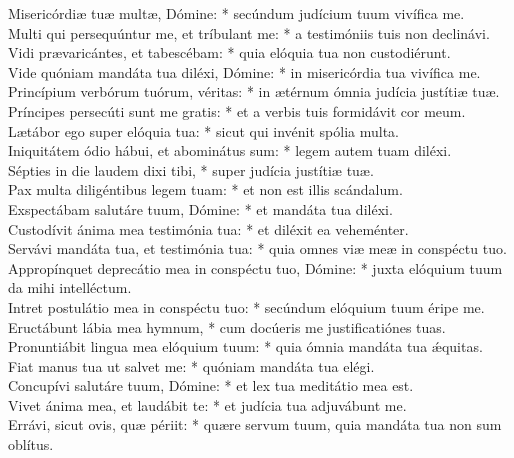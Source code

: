 {	Misericórdiæ tuæ multæ, Dómine: * secúndum judícium tuum vivífica me. \\
	Multi qui persequúntur me, et tríbulant me: * a testimóniis tuis non declinávi. \\
	Vidi prævaricántes, et tabescébam: * quia elóquia tua non custodiérunt. \\
	Vide quóniam mandáta tua diléxi, Dómine: * in misericórdia tua vivífica me. \\
	Princípium verbórum tuórum, véritas: * in ætérnum ómnia judícia justítiæ tuæ. \\
	Príncipes persecúti sunt me gratis: * et a verbis tuis formidávit cor meum. \\
	Lætábor ego super elóquia tua: * sicut qui invénit spólia multa. \\
	Iniquitátem ódio hábui, et abominátus sum: * legem autem tuam diléxi. \\
	Sépties in die laudem dixi tibi, * super judícia justítiæ tuæ. \\
	Pax multa diligéntibus legem tuam: * et non est illis scándalum. \\
	Exspectábam salutáre tuum, Dómine: * et mandáta tua diléxi. \\
	Custodívit ánima mea testimónia tua: * et diléxit ea veheménter. \\
	Servávi mandáta tua, et testimónia tua: * quia omnes viæ meæ in conspéctu tuo. \\
	Appropínquet deprecátio mea in conspéctu tuo, Dómine: * juxta elóquium tuum da mihi intelléctum. \\
	Intret postulátio mea in conspéctu tuo: * secúndum elóquium tuum éripe me. \\
	Eructábunt lábia mea hymnum, * cum docúeris me justificatiónes tuas. \\
	Pronuntiábit lingua mea elóquium tuum: * quia ómnia mandáta tua ǽquitas. \\
	Fiat manus tua ut salvet me: * quóniam mandáta tua elégi. \\
	Concupívi salutáre tuum, Dómine: * et lex tua meditátio mea est. \\
	Vivet ánima mea, et laudábit te: * et judícia tua adjuvábunt me. \\
	Errávi, sicut ovis, quæ périit: * quære servum tuum, quia mandáta tua non sum oblítus. \\
}

